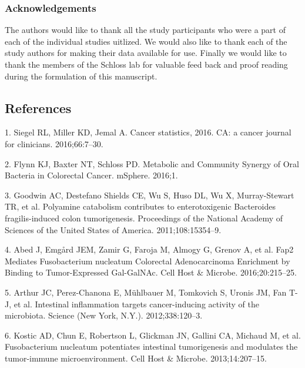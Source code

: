 \documentclass[12pt,]{article}
\begin{document}
\subsubsection{Acknowledgements}\label{acknowledgements}

The authors would like to thank all the study participants who were a
part of each of the individual studies uitlized. We would also like to
thank each of the study authors for making their data available for use.
Finally we would like to thank the members of the Schloss lab for
valuable feed back and proof reading during the formulation of this
manuscript.

\newpage

\subsection{References}\label{references}

\hypertarget{refs}{}
\hypertarget{ref-siegel_cancer_2016}{}
1. Siegel RL, Miller KD, Jemal A. Cancer statistics, 2016. CA: a cancer
journal for clinicians. 2016;66:7--30.

\hypertarget{ref-flynn_metabolic_2016}{}
2. Flynn KJ, Baxter NT, Schloss PD. Metabolic and Community Synergy of
Oral Bacteria in Colorectal Cancer. mSphere. 2016;1.

\hypertarget{ref-goodwin_polyamine_2011}{}
3. Goodwin AC, Destefano Shields CE, Wu S, Huso DL, Wu X, Murray-Stewart
TR, et al. Polyamine catabolism contributes to enterotoxigenic
Bacteroides fragilis-induced colon tumorigenesis. Proceedings of the
National Academy of Sciences of the United States of America.
2011;108:15354--9.

\hypertarget{ref-abed_fap2_2016}{}
4. Abed J, Emgård JEM, Zamir G, Faroja M, Almogy G, Grenov A, et al.
Fap2 Mediates Fusobacterium nucleatum Colorectal Adenocarcinoma
Enrichment by Binding to Tumor-Expressed Gal-GalNAc. Cell Host \&
Microbe. 2016;20:215--25.

\hypertarget{ref-arthur_intestinal_2012}{}
5. Arthur JC, Perez-Chanona E, Mühlbauer M, Tomkovich S, Uronis JM, Fan
T-J, et al. Intestinal inflammation targets cancer-inducing activity of
the microbiota. Science (New York, N.Y.). 2012;338:120--3.

\hypertarget{ref-kostic_fusobacterium_2013}{}
6. Kostic AD, Chun E, Robertson L, Glickman JN, Gallini CA, Michaud M,
et al. Fusobacterium nucleatum potentiates intestinal tumorigenesis and
modulates the tumor-immune microenvironment. Cell Host \& Microbe.
2013;14:207--15.
\end{document}
